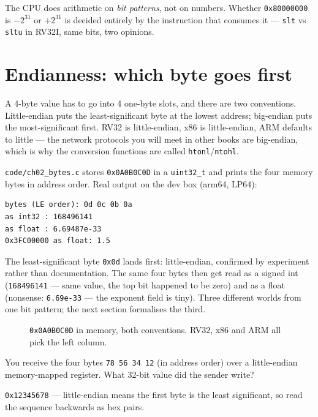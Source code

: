 \begin{principle}
The CPU does arithmetic on \emph{bit patterns}, not on numbers. Whether
\texttt{0x80000000} is $-2^{31}$ or $+2^{31}$ is decided entirely by the
instruction that consumes it --- \texttt{slt} vs \texttt{sltu} in RV32I,
same bits, two opinions.
\end{principle}

\section{Endianness: which byte goes first}
\label{sec:endian02}

A 4-byte value has to go into 4 one-byte slots, and there are two
conventions. Little-endian puts the least-significant byte at the
lowest address; big-endian puts the most-significant first. RV32 is
little-endian, x86 is little-endian, ARM defaults to little --- the
network protocols you will meet in other books are big-endian, which is
why the conversion functions are called \texttt{htonl}/\texttt{ntohl}.

\begin{example}
\label{ex:bytes02}
\texttt{code/ch02\_bytes.c} stores \texttt{0x0A0B0C0D} in a
\texttt{uint32\_t} and prints the four memory bytes in address order.
Real output on the dev box (arm64, LP64):

\begin{lstlisting}[basicstyle=\ttfamily\scriptsize]
bytes (LE order): 0d 0c 0b 0a
as int32 : 168496141
as float : 6.69487e-33
0x3FC00000 as float: 1.5
\end{lstlisting}

The least-significant byte \texttt{0x0d} lands first: little-endian,
confirmed by experiment rather than documentation. The same four bytes
then get read as a signed int (\texttt{168496141} --- same value, the
top bit happened to be zero) and as a float (nonsense:
\texttt{6.69e-33} --- the exponent field is tiny). Three different
worlds from one bit pattern; the next section formalises the third.
\end{example}

\begin{figure}[htbp]
\centering

\caption{\texttt{0x0A0B0C0D} in memory, both conventions. RV32, x86 and
ARM all pick the left column.}
\label{fig:endian02}
\end{figure}

\begin{checkpoint}
You receive the four bytes \texttt{78 56 34 12} (in address order) over
a little-endian memory-mapped register. What 32-bit value did the
sender write?
\end{checkpoint}
\begin{solution}
\texttt{0x12345678} --- little-endian means the first byte is the
least significant, so read the sequence backwards as hex pairs.
\end{solution}

